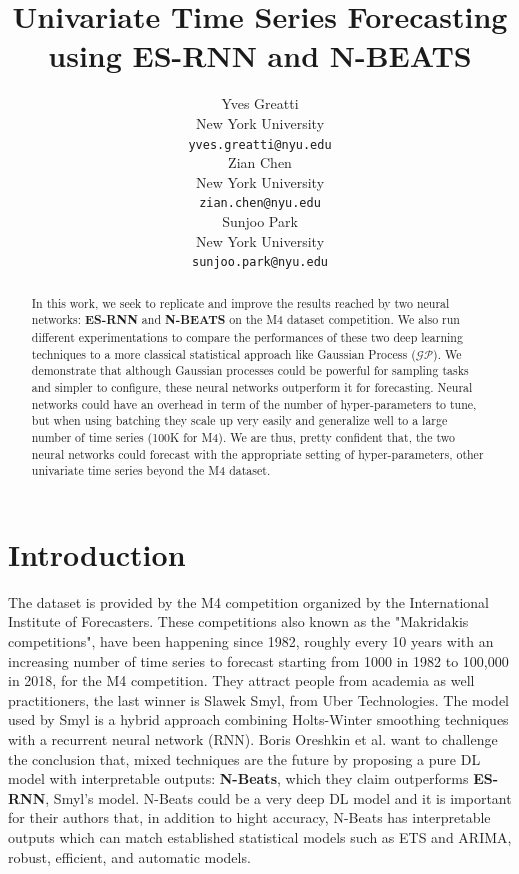\documentclass{article}
\title{Univariate Time Series Forecasting using ES-RNN and N-BEATS}
\author{%
  Yves Greatti \\
  New York University\\
  \texttt{yves.greatti@nyu.edu} \\
   \And
    Zian Chen \\
    New York University\\
    \texttt{zian.chen@nyu.edu} \\
    \And 
   Sunjoo Park\\
    New York University\\
    \texttt{sunjoo.park@nyu.edu}
}
\begin{document}
\maketitle

\begin{abstract}
  In this work, we seek to replicate and improve the results reached by two neural networks: \textbf{ES-RNN} and \textbf{N-BEATS} on the M4 dataset competition.
  We also run different experimentations to compare the performances of these two deep learning techniques to a more classical statistical approach like Gaussian Process ($\mathcal{GP}$).
  We demonstrate that although Gaussian processes could be powerful for sampling tasks and simpler to configure, these neural networks outperform it for forecasting. Neural networks could have an overhead in term of the number of hyper-parameters to tune, but when using batching they scale up very easily and generalize well to a large number of time series (100K for M4). We are thus, pretty confident that, the two neural networks could forecast with the appropriate setting of hyper-parameters, other univariate time series beyond the M4 dataset.  
  
 \end{abstract}

\section{Introduction}
\label{Introduction}

The dataset is provided by the M4 competition organized by the International Institute of Forecasters. These competitions also known as the "Makridakis competitions", have been happening since 1982, roughly every 10 years with an increasing number of time series to forecast
starting from 1000 in 1982  to 100,000 in 2018, for the M4 competition. They attract people from academia as well practitioners, the last winner is Slawek Smyl, from Uber Technologies. The model used by Smyl is a hybrid approach combining Holts-Winter smoothing
techniques with a recurrent neural network (RNN). Boris Oreshkin et al. want to challenge the conclusion that, mixed techniques are the future by proposing a pure DL model with interpretable outputs: \textbf{N-Beats}, which they claim outperforms \textbf{ES-RNN}, Smyl's model. N-Beats could be a very deep DL model and it is important for their authors that, in addition to hight accuracy, N-Beats has interpretable outputs which can match established statistical models such as ETS and ARIMA, robust, efficient, and automatic models. 
\end{document}
